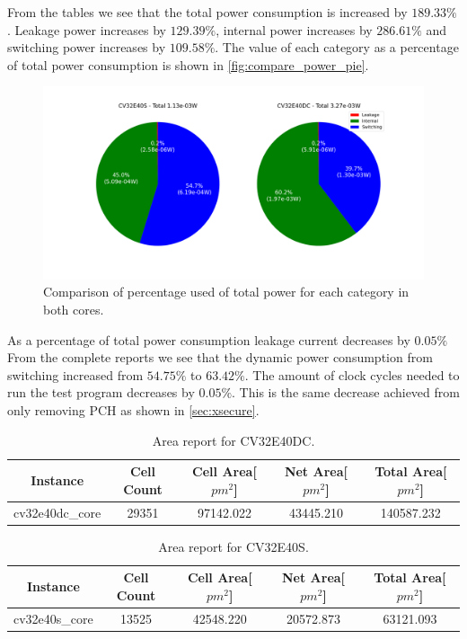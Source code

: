 \newpage

From the tables we see that the total power consumption is increased by $189.33\%$. Leakage power increases by $129.39\%$, internal power increases by $286.61\%$ and switching power increases by $109.58\%$. The value of each category as a percentage of total power consumption is shown in \autoref{fig:compare_power_pie}. 

\begin{figure}[h!]
    \centering
    \includegraphics[width=\textwidth]{docs/images/power_comapre_pie.png}
    \caption{Comparison of percentage used of total power for each category in both cores.}
    \label{fig:compare_power_pie}
\end{figure}


As a percentage of total power consumption leakage current decreases by $0.05\%$ From the complete reports we see that the dynamic power consumption from switching increased from $54.75\%$ to $63.42\%$. The amount of clock cycles needed to run the test program decreases by $0.05\%$. This is the same decrease achieved from only removing PCH as shown in \autoref{sec:xsecure}.

\begin{table}[h!]
\centering
\caption{Area report for CV32E40DC.}
\label{tab:cv32e40dc_area}
\begin{tabular}{c|cccc}
\toprule 
Instance & Cell Count & Cell Area[$pm^2$] & Net Area[$pm^2$] & Total Area[$pm^2$]\\
\midrule
\rowcolor{black!20} cv32e40dc\_core & 29351 & 97142.022 & 43445.210 & 140587.232\\
\bottomrule
\end{tabular}
\end{table}

\begin{table}[h!]
\centering
\caption{Area report for CV32E40S.}
\label{tab:cv32e40s_area}
\begin{tabular}{c|cccc}
\toprule 
Instance & Cell Count & Cell Area[$pm^2$] & Net Area[$pm^2$] & Total Area[$pm^2$]\\
\midrule
\rowcolor{black!20} cv32e40s\_core & 13525 & 42548.220 & 20572.873 & 63121.093\\
\bottomrule
\end{tabular}
\end{table}

